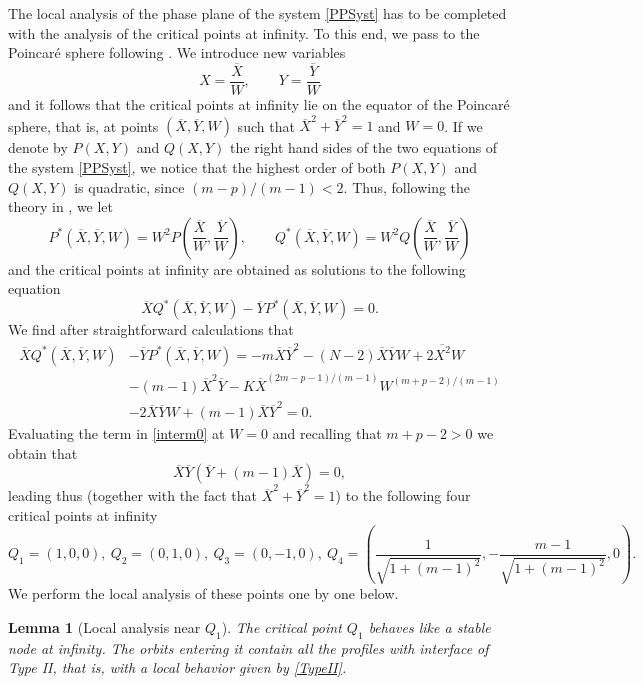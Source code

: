 \documentclass[a4paper,11pt]{article}
\newtheorem{lemma}[theorem]{Lemma}
\numberwithin{equation}{section}
\begin{document}
The local analysis of the phase plane of the system \eqref{PPSyst} has to be completed with the analysis of the critical points at infinity. To this end, we pass to the Poincar\'e sphere following \cite[Section 3.10]{Pe}. We introduce new variables
$$
X=\frac{\overline{X}}{W}, \qquad Y=\frac{\overline{Y}}{W}
$$
and it follows that the critical points at infinity lie on the equator of the Poincar\'e sphere, that is, at points $(\overline{X},\overline{Y},W)$ such that $\overline{X}^2+\overline{Y}^2=1$ and $W=0$. If we denote by $P(X,Y)$ and $Q(X,Y)$ the right hand sides of the two equations of the system \eqref{PPSyst}, we notice that the highest order of both $P(X,Y)$ and $Q(X,Y)$ is quadratic, since $(m-p)/(m-1)<2$. Thus, following the theory in \cite[Section 3.10]{Pe}, we let
$$
P^*(\overline{X},\overline{Y},W)=W^2P\left(\frac{\overline{X}}{W},\frac{\overline{Y}}{W}\right), \qquad Q^*(\overline{X},\overline{Y},W)=W^2Q\left(\frac{\overline{X}}{W},\frac{\overline{Y}}{W}\right)
$$
and the critical points at infinity are obtained as solutions to the following equation
$$
\overline{X}Q^*(\overline{X},\overline{Y},W)-\overline{Y}P^*(\overline{X},\overline{Y},W)=0.
$$
We find after straightforward calculations that
\begin{equation}\label{interm0}
\begin{split}
\overline{X}Q^*(\overline{X},\overline{Y},W)&-\overline{Y}P^*(\overline{X},\overline{Y},W)=-m\overline{X}\overline{Y}^2-(N-2)\overline{X}\overline{Y}W+2\overline{X^2}W\\
&-(m-1)\overline{X}^2\overline{Y}-K\overline{X}^{(2m-p-1)/(m-1)}W^{(m+p-2)/(m-1)}\\&-2\overline{X}\overline{Y}W+(m-1)\overline{X}\overline{Y}^2=0.
\end{split}
\end{equation}
Evaluating the term in \eqref{interm0} at $W=0$ and recalling that $m+p-2>0$ we obtain that
$$
\overline{X}\overline{Y}(\overline{Y}+(m-1)\overline{X})=0,
$$
leading thus (together with the fact that $\overline{X}^2+\overline{Y}^2=1$) to the following four critical points at infinity
$$
Q_1=(1,0,0), \ Q_2=(0,1,0), \ Q_3=(0,-1,0), \ Q_4=\left(\frac{1}{\sqrt{1+(m-1)^2}},-\frac{m-1}{\sqrt{1+(m-1)^2}},0\right).
$$
We perform the local analysis of these points one by one below.
\begin{lemma}[Local analysis near $Q_1$]\label{lem.Q1}
The critical point $Q_1$ behaves like a stable node at infinity. The orbits entering it contain all the profiles with interface of Type II, that is, with a local behavior given by \eqref{TypeII}.
\end{lemma}
\end{document}
